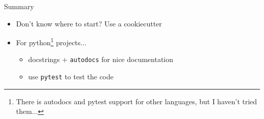 \documentclass[xcolor=table,aspectratio=169]{beamer}
\numberwithin{equation}{section}
\begin{document}
\begin{frame}{Summary}
  \begin{itemize}
    \item Don't know where to start? Use a cookiecutter
    \item For python\footnote{There is autodocs and pytest support for other languages, but I haven't tried them...} projects...
          \begin{itemize}
            \item docstrings + \texttt{autodocs} for nice documentation
            \item use \texttt{pytest} to test the code
          \end{itemize}
  \end{itemize}
\end{frame}
\end{document}
